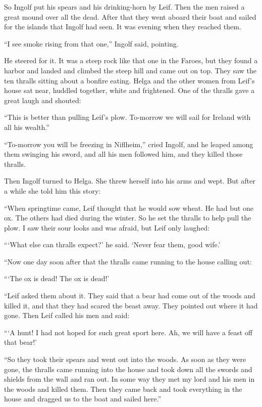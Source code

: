 So Ingolf put his spears and his drinking-horn by Leif. Then the men
raised a great mound over all the dead. After that they went aboard
their boat and sailed for the islands that Ingolf had seen. It was
evening when they reached them.

``I see smoke rising from that one,'' Ingolf said, pointing.

He steered for it. It was a steep rock like that one in the Faroes, but
they found a harbor and landed and climbed the steep hill and came out
on top. They saw the ten thralls sitting about a bonfire eating. Helga
and the other women from Leif's house sat near, huddled together, white
and frightened. One of the thralls gave a great laugh and shouted:

``This is better than pulling Leif's plow. To-morrow we will sail for
Ireland with all his wealth.''

``To-morrow you will be freezing in Niflheim,'' cried Ingolf, and he
leaped among them swinging his sword, and all his men followed him, and
they killed those thralls.

Then Ingolf turned to Helga. She threw herself into his arms and wept.
But after a while she told him this story:

``When springtime came, Leif thought that he would sow wheat. He had but
one ox. The others had died during the winter. So he set the thralls to
help pull the plow. I saw their sour looks and was afraid, but Leif only
laughed:

```What else can thralls expect?' he said. `Never fear them, good wife.'

``Now one day soon after that the thralls came running to the house
calling out:

```The ox is dead! The ox is dead!'

``Leif asked them about it. They said that a bear had come out of the
woods and killed it, and that they had scared the beast away. They
pointed out where it had gone. Then Leif called his men and said:

```A hunt! I had not hoped for such great sport here. Ah, we will have a
feast off that bear!'

``So they took their spears and went out into the woods. As soon as they
were gone, the thralls came running into the house and took down all the
swords and shields from the wall and ran out. In some way they met my
lord and his men in the woods and killed them. Then they came back and
took everything in the house and dragged us to the boat and sailed
here.''

